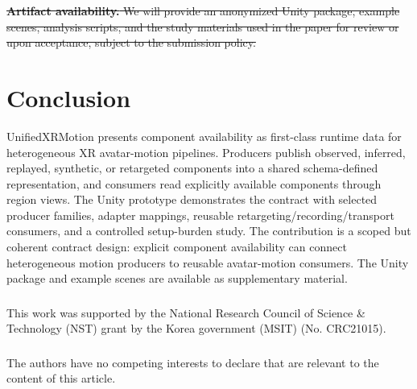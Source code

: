 \documentclass[runningheads]{llncs}
\newcommand{\radd}[1]{\textcolor{revadd}{#1}}
\newcommand{\rdel}[1]{\textcolor{revdel}{\sout{#1}}}
\newcommand{\radd}[1]{#1}
\newcommand{\rdel}[1]{}
\begin{document}
\rdel{\textbf{Artifact availability.} We will provide an anonymized Unity package, example scenes, analysis scripts, and the study materials used in the paper for review or upon acceptance, subject to the submission policy.}

\section{Conclusion}\label{sec:conclusion}
UnifiedXRMotion presents component availability as first-class runtime data for heterogeneous XR avatar-motion pipelines. Producers publish observed, inferred, replayed, synthetic, or retargeted components into a shared schema-defined representation, and consumers read explicitly available components through region views. The Unity prototype demonstrates the contract with selected producer families, adapter mappings, reusable retargeting/recording/transport consumers, and a controlled setup-burden study. The contribution is a scoped but coherent contract design: explicit component availability can connect heterogeneous motion producers to reusable avatar-motion consumers.
\radd{The Unity package and example scenes are available as supplementary material.}

\begin{credits}
\subsubsection{\ackname}
\radd{This work was supported by the National Research Council of Science \& Technology (NST) grant by the Korea government (MSIT) (No. CRC21015).}

\subsubsection{\discintname}
\radd{The authors have no competing interests to declare that are relevant to the content of this article.}
\end{credits}



\end{document}
